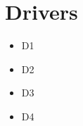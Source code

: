 \section{Drivers}

\begin{itemize}
	\item D1 \label{D1}
	\item D2 \label{D2}
	\item D3 \label{D3}
	\item D4 \label{D4}
		
\end{itemize}